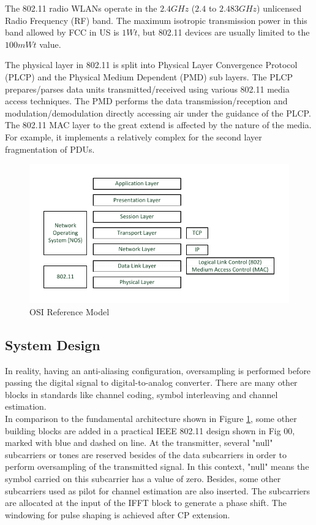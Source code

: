 The 802.11 radio WLANs operate in the $2.4 GHz$ ($2.4$ to $2.483 GHz$) unlicensed Radio Frequency (RF) band. The maximum isotropic transmission power in this band allowed by FCC in US is $1 Wt$, but 802.11 devices are usually limited to the $100 mWt$ value.

The physical layer in 802.11 is split into Physical Layer Convergence Protocol (PLCP) and the Physical Medium Dependent (PMD) sub layers. The PLCP prepares/parses data units transmitted/received using various 802.11 media access techniques. The PMD performs the data transmission/reception and modulation/demodulation directly accessing air under the guidance of the PLCP. The 802.11 MAC layer to the great extend is affected by the nature of the media. For example, it implements a relatively complex for the second layer fragmentation of PDUs.\\


\begin{figure}[h!]
\centering
\includegraphics[width=\textwidth]{content/fig/osi_ref_mdl.pdf}
\caption{OSI Reference Model}
\label{fig:osi_model}
\end{figure}

\subsection{System Design}

In reality, having an anti-aliasing configuration, oversampling is performed before passing the digital signal to digital-to-analog converter. There are many other blocks in standards like channel coding, symbol interleaving and channel estimation.\\
In comparison to the fundamental architecture shown in Figure \ref{fig:osi_model}, some other building blocks are added in a practical IEEE 802.11 design shown in Fig 00, marked with blue and dashed on line. At the transmitter, several "null" subcarriers or tones are reserved besides of the data subcarriers in order to perform oversampling of the transmitted signal. In this context, "null" means the symbol carried on this subcarrier has a value of zero. Besides, some other subcarriers used as pilot for channel estimation are also inserted. The subcarriers are allocated at the input of the IFFT block to generate a phase shift. The windowing for pulse shaping is achieved after CP extension.\\

